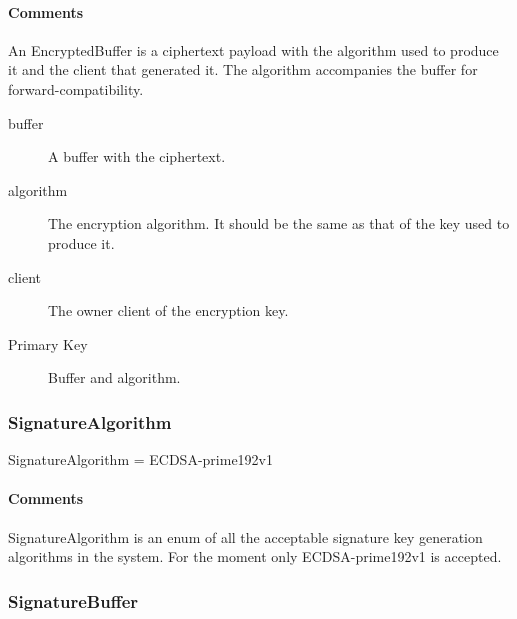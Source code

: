 \documentclass[a4paper,10pt]{article}
\begin{document}
\begin{inparaitem}[ ]
 \item \infrastructure
\end{inparaitem}

\paragraph*{Comments}
An EncryptedBuffer is a ciphertext payload with the algorithm used to produce it and the client that generated it. The algorithm accompanies the buffer for forward-compatibility.

\SpecialItem
\begin{description}
 \item[buffer] A buffer with the ciphertext.
 \item[algorithm] The encryption algorithm. It should be the same as that of the key used to produce it.
 \item[client] The owner client of the encryption key.
\end{description}

\begin{description}
 \item[Primary Key] Buffer and algorithm.
\end{description}

\subsubsection{SignatureAlgorithm}
\begin{verbbox}
SignatureAlgorithm = { ECDSA-prime192v1 }
\end{verbbox}
\begin{center}
\theverbbox
\end{center}

\begin{inparaitem}[ ]
 \item \infrastructure
\end{inparaitem}

\paragraph*{Comments}
SignatureAlgorithm is an enum of all the acceptable signature key generation algorithms in the system. For the moment only ECDSA-prime192v1 is accepted.

\subsubsection{SignatureBuffer}
\end{document}
